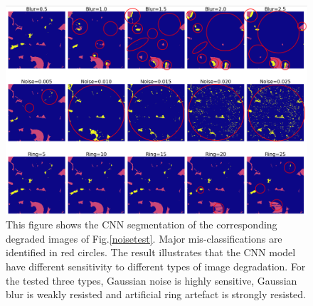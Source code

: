 \documentclass[draft,linenumbers]{agujournal2018}
\begin{document}
\begin{figure}[h]
 \centering
 \includegraphics[width=33pc]{imgs/noisetest2.png}
 \caption{This figure shows the CNN segmentation of the corresponding degraded images of Fig.\ref{noisetest}. Major mis-classifications are identified in red circles. The result illustrates that the CNN model have different sensitivity to different types of image degradation. For the tested three types, Gaussian noise is highly sensitive, Gaussian blur is weakly resisted and artificial ring artefact is strongly resisted.}
 \label{misclassification}
 \end{figure}
 
\end{document}
